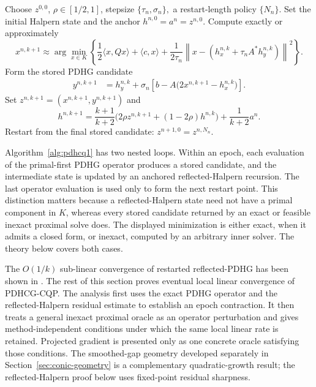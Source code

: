 \documentclass[letterpaper]{article} %
\newcommand{\name}{PDHCG-CQP\xspace}
\theoremstyle{definition}
\theoremstyle{remark}
\begin{document}
\begin{algorithm}[H]
\caption{\name: restarted reflected-Halpern PDHG for the original conic QP}
\label{alg:pdhcq1}
\begin{algorithmic}[1]
\State Choose $z^{0,0}$, $\rho\in[1/2,1]$, stepsize $\{\tau_n, \sigma_n\},$ a restart-length policy $\{N_n\}$.
    \State Set the initial Halpern state and the anchor $h^{n,0}=a^n=z^{n,0}$.
        \State Compute exactly or approximately
        \[
             x^{n,k+1}
            \approx
            \arg\min_{x\in K}
            \left\{
                \frac12\langle x,Qx\rangle+\langle c,x\rangle
                +\frac{1}{2\tau_n} \left\|x- \left(h_x^{n,k}+\tau_nA^*h_y^{n,k} \right) \right\|^2
            \right\}.
        \]
        \State Form the stored PDHG candidate
        \[
        \begin{aligned}
            y^{n,k+1}
            &=
            h_y^{n,k}
            +\sigma_n\!\left[
                b-A\bigl(2x^{n,k+1}-h_x^{n,k}\bigr)
            \right].
        \end{aligned}
        \]
            \State Set $
            z^{n,k+1}
            =
            (x^{n,k+1},y^{n,k+1})$ and 
            \[
                h^{n,k+1}
                =
                \frac{k+1}{k+2}
                \bigl(2\rho z^{n,k+1}+(1-2\rho)h^{n,k}\bigr)
                +
                \frac{1}{k+2}a^n .
            \]
    \EndFor
    \State Restart from the final stored candidate:
    $z^{n+1,0}=z^{n,N_n}$.
\EndFor
\end{algorithmic}
\end{algorithm}

Algorithm~\ref{alg:pdhcq1} has two nested loops.  Within an epoch, each
evaluation of the primal-first PDHG operator produces a stored candidate, and the
intermediate state is updated by an anchored reflected-Halpern recursion.  The
last operator evaluation is used only to form the next restart point.  This
distinction matters because a reflected-Halpern state need not have a primal
component in $K$, whereas every stored candidate returned by an exact or
feasible inexact proximal solve does. The displayed minimization is either exact, when it admits a closed form, or inexact, computed by an arbitrary inner solver. The theory below covers both cases.

The $O(1/k)$ sub-linear convergence of restarted reflected-PDHG has been shown in \cite{liu2026reflected}. The rest of this section proves eventual local linear convergence of
PDHCG-CQP.  The analysis first uses the exact PDHG operator and the
reflected-Halpern residual estimate to establish an epoch contraction.  It
then treats a general inexact proximal oracle as an operator perturbation and
gives method-independent conditions under which the same local linear rate is
retained.  Projected gradient is presented only as one concrete oracle
satisfying those conditions.  The smoothed-gap geometry developed separately
in Section~\ref{sec:conic-geometry} is a complementary quadratic-growth
result; the reflected-Halpern proof below uses fixed-point residual sharpness.
\end{document}

